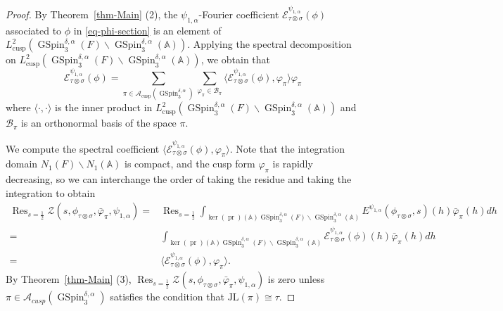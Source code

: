 \documentclass[12pt]{amsart}
\newcommand{\A}{\mathbb{A}}
\newcommand{\Res}{\operatorname{Res}}
\newcommand{\JL}{\mathrm{JL}}
\newcommand{\CE}{{\mathcal{E}}}
\theoremstyle{remark}
\newcommand{\pr}{\operatorname{pr}}
\DeclareMathOperator{\GSpin}{GSpin}
\begin{document}
\begin{proof}
By Theorem~\ref{thm-Main} (2), the $\psi_{1,\alpha}$-Fourier coefficient 
$\CE_{\tau\otimes\sigma}^{\psi_{1,\alpha}}(\phi)$ associated to $\phi$ in \eqref{eq-phi-section}
is an element of $L_{\text{cusp}}^2(\GSpin_3^{\delta,\alpha}(F)\backslash \GSpin_3^{\delta,\alpha}(\A))$. Applying the spectral decomposition on $L_{\text{cusp}}^2(\GSpin_3^{\delta,\alpha}(F)\backslash \GSpin_3^{\delta,\alpha}(\A))$, we obtain that 
\begin{equation}
\label{eq-JL-spectralside}
\CE^{\psi_{1,\alpha}}_{\tau\otimes\sigma}(\phi)=\sum_{\pi\in\mathcal{A}_{\text{cusp}}(\GSpin_3^{\delta,\alpha})}
\sum_{\varphi_{\pi}\in \mathcal{B}_\pi} \langle\CE^{\psi_{1,\alpha}}_{\tau\otimes\sigma}(\phi),\varphi_{\pi}\rangle\varphi_{\pi}
\end{equation}
where  $\langle\cdot,\cdot\rangle$ is the inner product in $L^{2}_{\text{cusp}}(\GSpin_3^{\delta,\alpha}(F)\backslash \GSpin_3^{\delta,\alpha}(\A))$ and
$\mathcal{B}_\pi$ is an orthonormal basis of the space $\pi$.

We compute the spectral coefficient $\langle\CE^{\psi_{1,\alpha}}_{\tau\otimes\sigma}(\phi),\varphi_{\pi}\rangle$. Note that the integration domain $N_1(F)\backslash N_1(\A)$ is compact, and the cusp form $\varphi_\pi$ is rapidly decreasing, so we can interchange the order of taking the residue and taking the integration to obtain
\begin{equation*}
\begin{split}	
\Res_{s=\frac{1}{2}}\mathcal{Z}(s,\phi_{\tau\otimes\sigma},\bar{\varphi}_{\pi},\psi_{1,\alpha})
=&\Res_{s=\frac{1}{2}}\int_{\ker(\pr)(\A) \GSpin_3^{\delta,\alpha}(F)\backslash \GSpin_3^{\delta,\alpha}(\A)}
E^{\psi_{1,\alpha}}(\phi_{\tau\otimes\sigma},s)(h)\bar{\varphi}_{\pi}(h)d h\\
=&\int_{\ker(\pr)(\A) \GSpin_3^{\delta,\alpha}(F)\backslash \GSpin_3^{\delta,\alpha}(\A)}\CE^{\psi_{1,\alpha}}_{\tau\otimes\sigma}(\phi)(h)\bar{\varphi}_{\pi}(h)dh\\
=&\langle\CE^{\psi_{1,\alpha}}_{\tau\otimes\sigma}(\phi),\varphi_{\pi}\rangle.
\end{split}
\end{equation*}
By Theorem~\ref{thm-Main} (3), $\Res_{s=\frac{1}{2}}\mathcal{Z}(s,\phi_{\tau\otimes\sigma},\bar{\varphi}_{\pi},\psi_{1,\alpha})$ is zero unless $\pi\in\mathcal{A}_{cusp}(\GSpin_3^{\delta,\alpha})$ satisfies the condition that $\JL(\pi)\cong \tau$. 


\end{proof}
\end{document}
